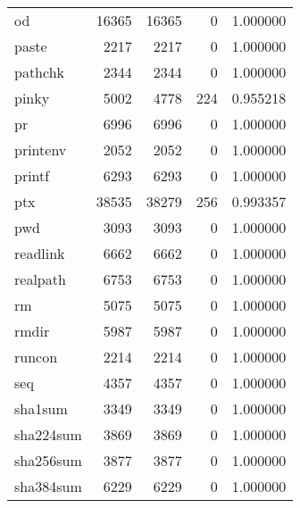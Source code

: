 \begin{longtable}{lrrrr}
od        &                    16365 &        16365 &             0 &                 1.000000 \\
paste     &                     2217 &         2217 &             0 &                 1.000000 \\
pathchk   &                     2344 &         2344 &             0 &                 1.000000 \\
pinky     &                     5002 &         4778 &           224 &                 0.955218 \\
pr        &                     6996 &         6996 &             0 &                 1.000000 \\
printenv  &                     2052 &         2052 &             0 &                 1.000000 \\
printf    &                     6293 &         6293 &             0 &                 1.000000 \\
ptx       &                    38535 &        38279 &           256 &                 0.993357 \\
pwd       &                     3093 &         3093 &             0 &                 1.000000 \\
readlink  &                     6662 &         6662 &             0 &                 1.000000 \\
realpath  &                     6753 &         6753 &             0 &                 1.000000 \\
rm        &                     5075 &         5075 &             0 &                 1.000000 \\
rmdir     &                     5987 &         5987 &             0 &                 1.000000 \\
runcon    &                     2214 &         2214 &             0 &                 1.000000 \\
seq       &                     4357 &         4357 &             0 &                 1.000000 \\
sha1sum   &                     3349 &         3349 &             0 &                 1.000000 \\
sha224sum &                     3869 &         3869 &             0 &                 1.000000 \\
sha256sum &                     3877 &         3877 &             0 &                 1.000000 \\
sha384sum &                     6229 &         6229 &             0 &                 1.000000 \\

\end{longtable}
